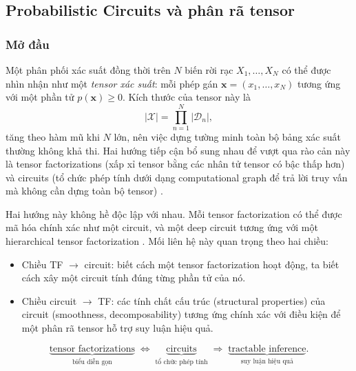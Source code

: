 \subsection{Probabilistic Circuits và phân rã tensor}
\makeatletter
{}
\makeatother

\subsubsection{Mở đầu}

Một phân phối xác suất đồng thời trên $N$ biến rời rạc $X_1, \ldots, X_N$ có thể
được nhìn nhận như một \emph{tensor xác suất}: mỗi phép gán
$\mathbf{x} = (x_1, \ldots, x_N)$ tương ứng với một phần tử
$p(\mathbf{x}) \geq 0$.  Kích thước của tensor này là
\begin{equation}
    |\mathcal{X}| = \prod_{n=1}^{N} |\mathcal{D}_n|,
\end{equation}
tăng theo hàm mũ khi $N$ lớn, nên việc dựng tường minh toàn bộ bảng xác suất
thường không khả thi. Hai hướng tiếp cận bổ sung nhau để vượt qua rào cản này là
tensor factorizations (xấp xỉ tensor bằng các nhân tử tensor có bậc thấp hơn) và circuits
(tổ chức phép tính dưới dạng computational graph để trả lời truy vấn mà không cần
dựng toàn bộ tensor) \cite{chrysos2025foundationsTutorial}.

Hai hướng này không hề độc lập với nhau. Mỗi tensor factorization có thể được mã hóa
chính xác như một circuit, và một deep circuit tương ứng với một hierarchical tensor
factorization \cite{chrysos2025foundationsTutorial, loconte2025relationship}.  Mối
liên hệ này quan trọng theo hai chiều:

\begin{itemize}[leftmargin=2em]
    \item Chiều TF $\to$ circuit: biết cách một tensor factorization hoạt động,
    ta biết cách xây một circuit tính đúng từng phần tử của nó.
    \item Chiều circuit $\to$ TF: các tính chất cấu trúc (structural properties)
    của circuit (smoothness, decomposability) tương ứng chính xác với điều kiện để
    một phân rã tensor hỗ trợ suy luận hiệu quả.
\end{itemize}

\begin{equation}
    \underbrace{\text{tensor factorizations}}_{\text{biểu diễn gọn}}
    \;\Longleftrightarrow\;
    \underbrace{\text{circuits}}_{\text{tổ chức phép tính}}
    \;\Longrightarrow\;
    \underbrace{\text{tractable inference}}_{\text{suy luận hiệu quả}}.
\end{equation}

